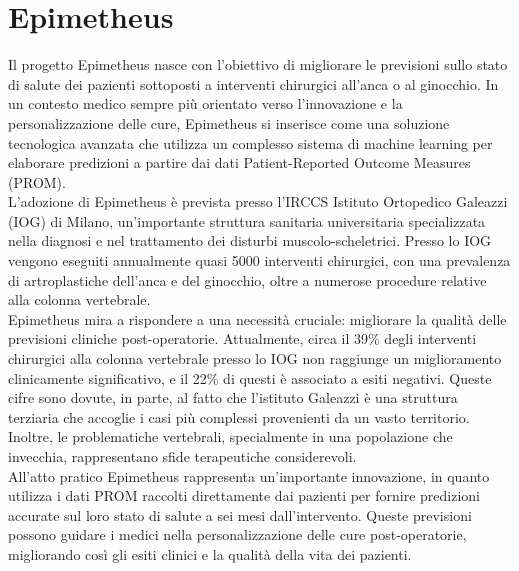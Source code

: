 \chapter{Epimetheus}
\label{cap:epimetheus}

Il progetto Epimetheus nasce con l'obiettivo di migliorare le previsioni sullo stato di salute dei pazienti sottoposti a interventi chirurgici all'anca o al ginocchio. In un contesto medico sempre più orientato verso l'innovazione e la personalizzazione delle cure, Epimetheus si inserisce come una soluzione tecnologica avanzata che utilizza un complesso sistema di machine learning per elaborare predizioni a partire dai dati Patient-Reported Outcome Measures (PROM).\\

L'adozione di Epimetheus è prevista presso l'IRCCS Istituto Ortopedico Galeazzi (IOG) di Milano, un'importante struttura sanitaria universitaria specializzata nella diagnosi e nel trattamento dei disturbi muscolo-scheletrici. Presso lo IOG vengono eseguiti annualmente quasi 5000 interventi chirurgici, con una prevalenza di artroplastiche dell'anca e del ginocchio, oltre a numerose procedure relative alla colonna vertebrale.\\

Epimetheus mira a rispondere a una necessità cruciale: migliorare la qualità delle previsioni cliniche post-operatorie. Attualmente, circa il 39\% degli interventi chirurgici alla colonna vertebrale presso lo IOG non raggiunge un miglioramento clinicamente significativo, e il 22\% di questi è associato a esiti negativi. Queste cifre sono dovute, in parte, al fatto che l'istituto Galeazzi è una struttura terziaria che accoglie i casi più complessi provenienti da un vasto territorio. Inoltre, le problematiche vertebrali, specialmente in una popolazione che invecchia, rappresentano sfide terapeutiche considerevoli.\\

All'atto pratico Epimetheus rappresenta un'importante innovazione, in quanto utilizza i dati PROM raccolti direttamente dai pazienti per fornire predizioni accurate sul loro stato di salute a sei mesi dall'intervento. Queste previsioni possono guidare i medici nella personalizzazione delle cure post-operatorie, migliorando così gli esiti clinici e la qualità della vita dei pazienti.\\

